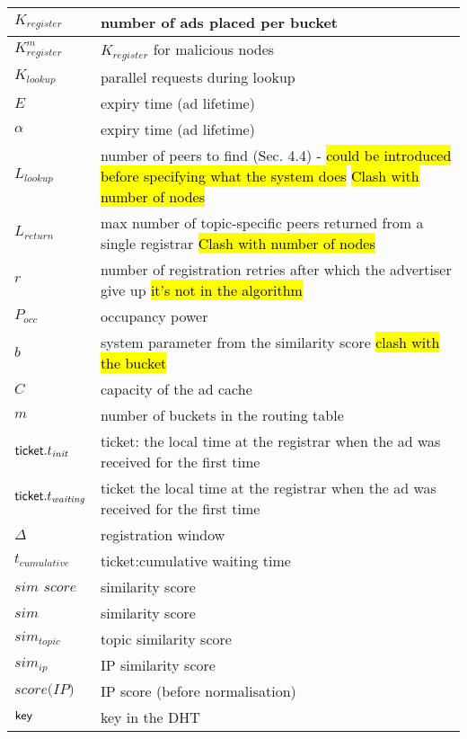 \begin{table*}
\begin{center}
\begin{tabular}{ | l | p{16cm} |}
      $K_{\textit{register}}$ & number of ads placed per bucket\\ \hline
      $K^m_{\textit{register}}$ & $K_{\textit{register}}$ for malicious nodes \\ \hline
      $K_{\textit{lookup}}$ & parallel requests during lookup\\ \hline
      $E$ & expiry time (ad lifetime) \\ \hline
      $\alpha$ & expiry time (ad lifetime) \\ \hline
      $L_{\textit{lookup}}$ & number of peers to find (Sec. 4.4) - \hl{could be introduced before specifying what the system does}  \hl{Clash with number of nodes} \\ \hline
      $L_{\textit{return}}$ & max number of topic-specific peers returned from a single registrar \hl{Clash with number of nodes} \\ \hline
      $r$ & number of registration retries after which the advertiser give up \hl{it's not in the algorithm} \\ \hline
      $P_\textit{occ}$ & occupancy power \\ \hline
      $b$ & system parameter from the similarity score \hl{clash with the bucket} \\ \hline
      $C$ & capacity of the ad cache \\ \hline
      $m$ & number of buckets in the routing table \\ \hline

      $\mathsf{ticket}.t_{\textit{init}}$ & ticket: the local time at the registrar when the ad was received for the first time \\ \hline
        $\mathsf{ticket}.t_{\textit{waiting}}$ & ticket the local time at the registrar when the ad was received for the first time \\ \hline
        $\Delta$ & registration window\\ \hline
        $t_{\textit{cumulative}}$ & ticket:cumulative waiting time \\ \hline

      $\textit{sim score}$ & similarity score \\ \hline
      $\textit{sim}$ & similarity score \\ \hline
      $\textit{sim}_\textit{topic}$ & topic similarity score \\ \hline
      $\textit{sim}_{ip}$ & IP similarity score \\ \hline
      $\textit{score(IP)}$ & IP score (before normalisation) \\ \hline


      $\mathsf{key}$ & key in the DHT \\ \hline
    \hline
  \end{tabular}
\end{center}
\end{table*}

